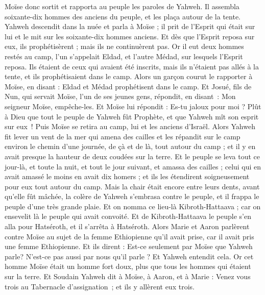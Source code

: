 \begin{multicols}{2}
Moïse donc sortit et rapporta au peuple les paroles de Yahweh. Il assembla soixante-dix hommes des anciens du peuple, et les plaça autour de la tente.
Yahweh descendit dans la nuée et parla à Moïse ; il prit de l'Esprit qui était sur lui et le mit sur les soixante-dix hommes anciens. Et dès que l'Esprit reposa sur eux, ils prophétisèrent ; mais ils ne continuèrent pas.
Or il eut deux hommes restés au camp, l'un s'appelait Eldad, et l'autre Médad, sur lesquels l'Esprit reposa. Ils étaient de ceux qui avaient été inscrits, mais ils n'étaient pas allés à la tente, et ils prophétisaient dans le camp.
Alors un garçon courut le rapporter à Moïse, en disant : Eldad et Médad prophétisent dans le camp.
Et Josué, fils de Nun, qui servait Moïse, l’un de ses jeunes gens, répondit, en disant : Mon seigneur Moïse, empêche-les.
Et Moïse lui répondit : Es-tu jaloux pour moi ? Plût à Dieu que tout le peuple de Yahweh fût Prophète, et que Yahweh mît son esprit sur eux !
Puis Moïse se retira au camp, lui et les anciens d'Israël.
Alors Yahweh fit lever un vent de la mer qui amena des cailles et les répandit sur le camp environ le chemin d'une journée, de çà et de là, tout autour du camp ; et il y en avait presque la hauteur de deux coudées sur la terre.
Et le peuple se leva tout ce jour-là, et toute la nuit, et tout le jour suivant, et amassa des cailles ; celui qui en avait amassé le moins en avait dix homers ; et ils les étendirent soigneusement pour eux tout autour du camp.
Mais la chair était encore entre leurs dents, avant qu’elle fût mâchée, la colère de Yahweh s'embrasa contre le peuple, et il frappa le peuple d'une très grande plaie.
Et on nomma ce lieu-là Kibroth-Hattaava ; car on ensevelit là le peuple qui avait convoité.
Et de Kibroth-Hattaava le peuple s'en alla pour Hatséroth, et il s'arrêta à Hatséroth.
\VerseOne{}Alors Marie et Aaron parlèrent contre Moïse au sujet de la femme Ethiopienne qu'il avait prise, car il avait pris une femme Ethiopienne.
Et ils dirent : Est-ce seulement par Moïse que Yahweh parle? N'est-ce pas aussi par nous qu'il parle ? Et Yahweh entendit cela. 
Or cet homme Moïse était un homme fort doux, plus que tous les hommes qui étaient sur la terre.
Et Soudain Yahweh dit à Moïse, à Aaron, et à Marie : Venez vous trois au Tabernacle d’assignation ; et ils y allèrent eux trois.

\end{multicols}

